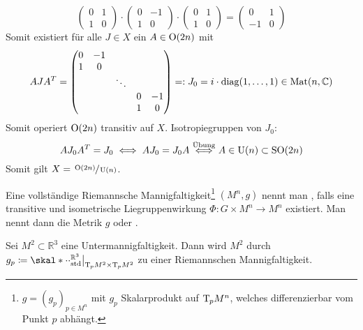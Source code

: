 \begin{beispiel*}[{name=[homogene Räume]},label=bsp:homSpaces]
\begin{enumerate}[1)]
\[\begin{pmatrix}
				0 & 1 \\ 1 & 0
			\end{pmatrix} \cdot \begin{pmatrix}
				0 & -1 \\ 1 & 0
			\end{pmatrix} \cdot \begin{pmatrix}
				0 & 1 \\
				1 & 0
			\end{pmatrix} = \begin{pmatrix}
				0 & 1 \\ -1 & 0
			\end{pmatrix}
		\]
		Somit existiert für alle $J \in X$ ein $A \in \operatorname{O}(2n)$ mit 
		\[
			A J A^T = \begin{pmatrix}
				0 & -1 & & & \\
				1 & 0 & & & \\
				& & \ddots & & \\
				& & & 0 & -1 \\
				& & & 1 & 0
			\end{pmatrix} =: J_0 = i \cdot \operatorname{diag}(1, \ldots ,1) \in \operatorname{Mat}(n,\mathbb{C})
		\]
		Somit operiert $\operatorname{O}(2n)$ transitiv auf $X$.
		Isotropiegruppen von $J_0$:
		\[
			A J_0 A^T = J_0 \iff A J_0 = J_0 A \stackrel{\mbox{\scriptsize Übung}}{\iff} A \in \operatorname{U}(n) \subset \operatorname{SO}(2n)
		\]
		Somit gilt $X = \sfrac{\operatorname{O}(2n)}{\operatorname{U}(n)}$.
 	\end{enumerate}
\end{beispiel*}

\begin{definition}[{name=[Riemannsche Mannigfaltigkeiten als homogene Räume]}]
	Eine vollständige Riemannsche Mannigfaltigkeit\footnote{$g= (g_p)_{p \in M^n}$ mit $g_p$ Skalarprodukt auf $\mathrm{T}\mkern-0.85mu_p M^n$, welches differenzierbar vom Punkt $p$ abhängt.} $(M^n,g)$ nennt man , falls eine transitive und isometrische Liegruppenwirkung $\Phi \colon G\times M^n \to M^n$ existiert.
	Man nennt dann die Metrik $g$  oder .
\end{definition}

\begin{beispiel*}[{name=[zweidimensionale Untermannigfaltigkeit des dreidimensionalen Raumes]}]
	Sei $M^2 \subset \mathbb{R}^3$ eine Untermannigfaltigkeit. 
	Dann wird $M^2$ durch $g_p \coloneqq \skal*{\cdot }{\cdot }_{\mathrm{std}}^{\mathbb{R}^3}\big|_{\Tmap_p M^2 \times \Tmap_p M^2}$ zu einer Riemannschen Mannigfaltigkeit.
\end{beispiel*}

